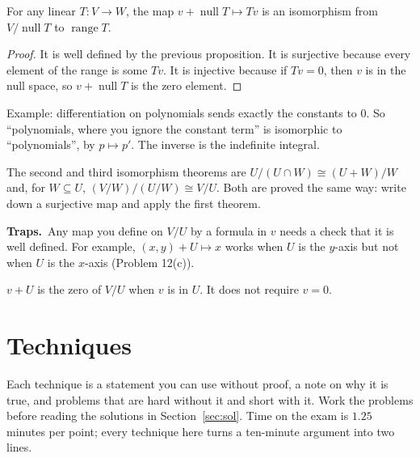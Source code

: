\documentclass[11pt]{scrartcl}
\DeclareMathOperator{\nul}{null}
\DeclareMathOperator{\range}{range}
\newcommand{\traps}{\par\medskip\noindent\textbf{\color{RawSienna}Traps.}\ }
\begin{document}
\begin{theorem*}
  For any linear $T\colon V\to W$, the map $v+\nul T\mapsto Tv$ is an isomorphism from $V/\nul T$ to $\range T$.
\end{theorem*}
\begin{proof}
  It is well defined by the previous proposition.
  It is surjective because every element of the range is some $Tv$.
  It is injective because if $Tv=0$, then $v$ is in the null space, so $v+\nul T$ is the zero element.
\end{proof}
Example: differentiation on polynomials sends exactly the constants to $0$. So ``polynomials, where you ignore the constant term'' is isomorphic to ``polynomials'', by $p\mapsto p'$. The inverse is the indefinite integral.

The second and third isomorphism theorems are $U/(U\cap W)\cong(U+W)/W$ and, for $W\subseteq U$, $(V/W)/(U/W)\cong V/U$. Both are proved the same way: write down a surjective map and apply the first theorem.

\traps Any map you define on $V/U$ by a formula in $v$ needs a check that it is well defined.
For example, $(x,y)+U\mapsto x$ works when $U$ is the $y$-axis but not when $U$ is the $x$-axis (Problem 12(c)).

$v+U$ is the zero of $V/U$ when $v$ is in $U$. It does not require $v=0$.

\clearpage
\section{Techniques}

Each technique is a statement you can use without proof, a note on why it is true, and problems that are hard without it and short with it. Work the problems before reading the solutions in Section~\ref{sec:sol}. Time on the exam is $1.25$ minutes per point; every technique here turns a ten-minute argument into two lines.

\newcommand{\why}{\par\noindent\textbf{Why.}\ }
\newcommand{\probs}{\par\medskip\noindent\textbf{Problems.}}
\end{document}
